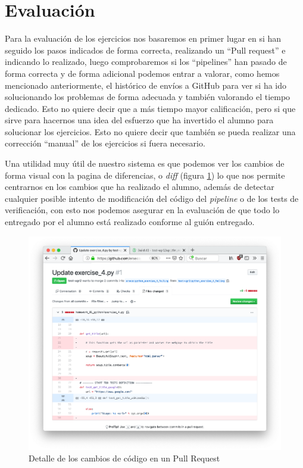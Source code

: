 \section{Evaluación}

Para la evaluación de los ejercicios nos basaremos en primer lugar en si han seguido los pasos indicados de forma correcta, realizando un ``Pull request'' e indicando lo realizado, luego comprobaremos si los ``pipelines'' han pasado de forma correcta y de forma adicional podemos entrar a valorar, como hemos mencionado anteriormente, el histórico de envíos a GitHub para ver si ha ido solucionando los problemas de forma adecuada y también valorando el tiempo dedicado. Esto no quiere decir que a más tiempo mayor calificación, pero si que sirve para hacernos una idea del esfuerzo que ha invertido el alumno para solucionar los ejercicios. Esto no quiere decir que también se pueda realizar una corrección ``manual'' de los ejercicios si fuera necesario.

\bigskip
Una utilidad muy útil de nuestro sistema es que podemos ver los cambios de forma visual con la pagina de diferencias, o \textit{diff} (figura \ref{fig:github_pr_diff}) lo que nos permite centrarnos en los cambios que ha realizado el alumno, además de detectar cualquier posible intento de modificación del código del \textit{pipeline} o de los tests de verificación, con esto nos podemos asegurar en la evaluación de que todo lo entregado por el alumno está realizado conforme al guión entregado.

\begin{figure}[h!]
\centering
\includegraphics[width=1.0\textwidth]{../images/github_pr_diff}
\caption{Detalle de los cambios de código en un Pull Request}
\label{fig:github_pr_diff}
\end{figure}




